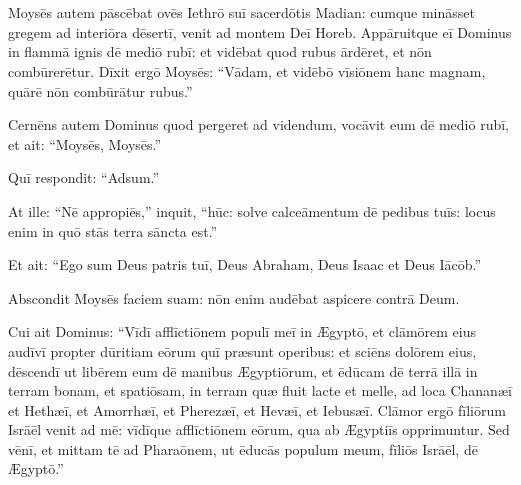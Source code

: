 \chapter{}

\thispagestyle{empty}

\vspace*{-0.75cm}
Moysēs autem pāscēbat ovēs Iethrō suī sacerdōtis Madian:
cumque mināsset gregem ad interiōra dēsertī,
venit ad montem Deī Horeb.
Appāruitque eī Dominus in flammā ignis dē mediō rubī:
et vidēbat quod rubus ārdēret, et nōn combūrerētur.
Dīxit ergō Moysēs: ``Vādam, et vidēbō vīsiōnem hanc magnam, quārē nōn combūrātur rubus.''

Cernēns autem Dominus quod pergeret ad videndum,
vocāvit eum dē mediō rubī, et ait: ``Moysēs, Moysēs.''

Quī respondit: ``Adsum.''

At ille: ``Nē appropiēs,'' inquit, ``hūc: solve calceāmentum dē pedibus tuīs: locus enim
in quō stās terra sāncta est.'' 

Et ait: ``Ego sum Deus patris tuī, Deus Abraham, Deus Isaac et Deus Iācōb.''

Abscondit Moysēs faciem suam: nōn enim audēbat aspicere contrā Deum.

Cui ait Dominus: ``Vīdī afflīctiōnem populī meī in Ægyptō,
et clāmōrem eius audīvī propter dūritiam eōrum quī præsunt operibus:
et sciēns dolōrem eius, dēscendī ut libērem eum dē manibus Ægyptiōrum,
et ēdūcam dē terrā illā in terram bonam, et spatiōsam,
in terram quæ fluit lacte et melle,
 ad loca Chananæī et Hethæī, et Amorrhæī, et Pherezæī, et Hevæī, et Iebusæī.
Clāmor ergō fīliōrum Isrāēl venit ad mē: vīdīque afflīctiōnem eōrum,
qua ab Ægyptiīs opprimuntur.
Sed vēnī, et mittam tē ad Pharaōnem,
ut ēducās populum meum, fīliōs Isrāēl, dē Ægyptō.''

